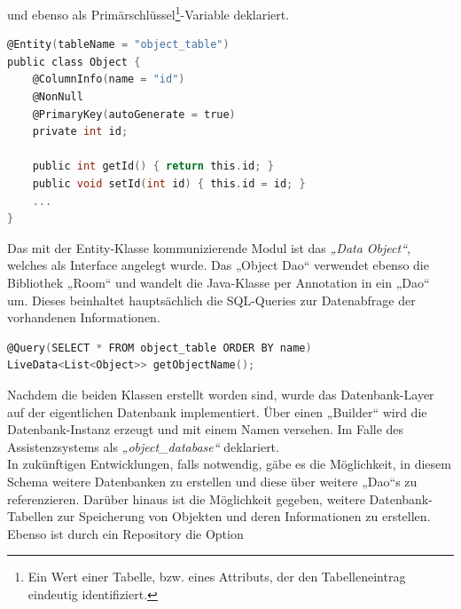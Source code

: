 und ebenso als Primärschlüssel\footnote{Ein Wert einer Tabelle, bzw. eines Attributs, der den Tabelleneintrag eindeutig identifiziert.}-Variable 
deklariert.
\\ 
\begin{lstlisting}[language=C,
    frame=lines,           % Ein Rahmen um den Code (single for box, lines for top and bottom)
    xleftmargin=\parindent,  % Rahmen link von den Zahlen
    style=algoBericht,
    label={code:entity},
    captionpos=b,           % Caption unter den Code setzen
caption={Entity Code zur Initialisierung der Objekte}]
@Entity(tableName = "object_table")
public class Object {
    @ColumnInfo(name = "id")
    @NonNull
    @PrimaryKey(autoGenerate = true)
    private int id;

    public int getId() { return this.id; }
    public void setId(int id) { this.id = id; }
    ... 
}
\end{lstlisting}
\pagebreak
Das mit der Entity-Klasse kommunizierende Modul ist das \textit{„Data Object“}, welches als Interface angelegt wurde. Das „Object Dao“ verwendet ebenso die Bibliothek 
„Room“ und wandelt die Java-Klasse per Annotation in ein „Dao“ um. Dieses beinhaltet hauptsächlich die SQL-Queries zur Datenabfrage der vorhandenen Informationen. 
\\
\begin{lstlisting}[language=C,
    frame=lines,           % Ein Rahmen um den Code (single for box, lines for top and bottom)
    xleftmargin=\parindent,  % Rahmen link von den Zahlen
    style=algoBericht,
    label={code:query},
    captionpos=b,           % Caption unter den Code setzen
caption={SQL-Query zur Abfrage der Objekt-Namen}]
@Query(SELECT * FROM object_table ORDER BY name)
LiveData<List<Object>> getObjectName();
\end{lstlisting}
Nachdem die beiden Klassen erstellt worden sind, wurde das Datenbank-Layer auf der eigentlichen Datenbank implementiert. Über einen „Builder“ wird die 
Datenbank-Instanz erzeugt und mit einem Namen versehen. Im Falle des Assistenzsystems als \textit{„object\_database“} deklariert. 
\\ 
In zukünftigen Entwicklungen, 
falls notwendig, gäbe es die Möglichkeit, in diesem Schema weitere Datenbanken zu erstellen und diese über weitere „Dao“s zu referenzieren. Darüber hinaus ist die 
Möglichkeit gegeben, weitere Datenbank-Tabellen zur Speicherung von Objekten und deren Informationen zu erstellen. Ebenso ist durch ein Repository die Option 
